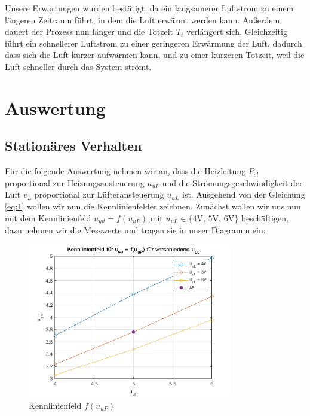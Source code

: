\documentclass{report}
\begin{document}
Unsere Erwartungen wurden bestätigt, da ein langsamerer Luftstrom zu einem längeren Zeitraum führt, in dem die Luft erwärmt werden kann. Außerdem dauert der Prozess nun länger und die Totzeit $T_{t}$ verlängert sich. Gleichzeitig führt ein schnellerer Luftstrom zu einer geringeren Erwärmung der Luft, dadurch dass sich die Luft kürzer aufwärmen kann, und zu einer kürzeren Totzeit, weil die Luft schneller durch das System strömt.

\newpage

\section{Auswertung}

\subsection{Stationäres Verhalten}
\label{sec:stat-verh}

Für die folgende Auswertung nehmen wir an, dass die Heizleitung $P_{el}$ proportional zur Heizungsansteuerung $u_{uP}$ und die Strömungsgeschwindigkeit der Luft $v_{L}$ proportional zur Lüfteransteuerung $u_{uL}$ ist. Ausgehend von der Gleichung \ref{eq:1} wollen wir nun die Kennlinienfelder zeichnen.
Zunächst wollen wir uns nun mit dem Kennlinienfeld $u_{y\vartheta} = f(u_{uP})$ mit $u_{uL} \in \{\text{4V, 5V, 6V}\}$ beschäftigen, dazu nehmen wir die Messwerte und tragen sie in unser Diagramm ein:

\begin{figure}[h]
  \centering
  \includegraphics[width=0.8\textwidth]{../assets/images/RTP/kennlinieA11rtp1.png}
  \caption{Kennlinienfeld $f(u_{uP})$}
  \label{fig:kennuy}
\end{figure}
\end{document}
